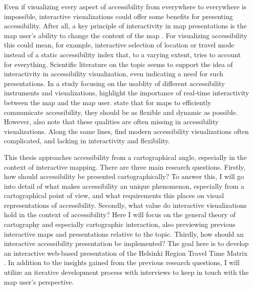 \documentclass[12pt]{article}
\begin{document}
Even if visualizing every aspect of accessibility from everywhere to everywhere is impossible,
interactive visualizations could offer some benefits for presenting accessibility.
After all, a key principle of interactivity in map presentations is
the map user's ability to change the content of the map \parencite{rot2013}.
For visualizing accessibility this could mean, for example,
interactive selection of location or travel mode instead of
a static accessibility index that, to a varying extent, tries to account for everything.
Scientific literature on the topic seems to support the idea of
interactivity in accessibility visualization, even indicating a need for such presentations.
In a study focusing on the usablity of different accessibility instruments and visualizations,  %
\textcite{te2014} highlight the importance of real-time interactivity between the map and the map user.
\textcite{but2018} state that for maps to efficiently communicate accessibility,
they should be as flexible and dynamic as possible.
However, \textcite{but2018} also note that these qualities are often missing in accessibility visualizations.
Along the same lines, \textcite{paj2021} find modern accessibility visualizations often complicated,
and lacking in interactivity and flexibility.

This thesis approaches accessibility from a cartographical angle,
especially in the context of interactive mapping.
There are three main research questions.
Firstly, how should accessibility be presented cartographically?
To answer this, I will go into detail of what makes accessibility an unique phenomenon,
especially from a cartographical point of view,
and what requirements this places on visual representations of accessibility.
Secondly, what value do interactive visualizations hold in the context of accessibility?
Here I will focus on the general theory of cartography and especially cartographic interaction,
also previewing previous interactive maps and presentations relative to the topic.
Thirdly, how should an interactive accessibility presentation be implemented?
The goal here is to develop an interactive web-based presentation of the
Helsinki Region Travel Time Matrix \parencite{ten2020}.
In addition to the insights gained from the previous research questions,
I will utilize an iterative development process with interviews
to keep in touch with the map user's perspective.
\end{document}
